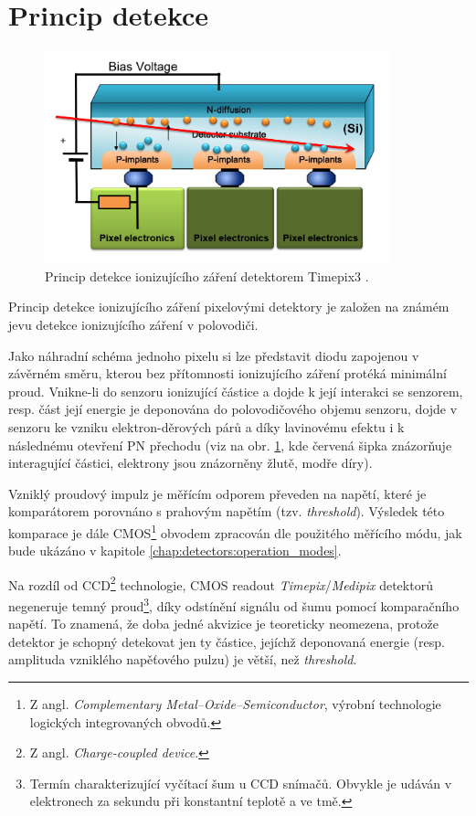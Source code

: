 \section{Princip detekce}\label{chap:detectors:princip}
\begin{figure}[th]
	\begin{center}
		\includegraphics[width=10cm]{figures/det_recombination.png}
		\caption{Princip detekce ionizujícího záření detektorem Timepix3 \cite{PlatkevicDisertace}.}
		\label{fig:det:recombination}
	\end{center}
\end{figure}

Princip detekce ionizujícího záření pixelovými detektory je založen na známém jevu detekce ionizujícího záření v polovodiči. 

Jako náhradní schéma jednoho pixelu si lze představit diodu zapojenou v závěrném směru, kterou bez přítomnosti ionizujícího záření protéká minimální proud. Vnikne-li do senzoru ionizující částice a dojde k její interakci se senzorem, resp. část její energie je deponována do polovodičového objemu senzoru, dojde v senzoru ke vzniku elektron-děrových párů a díky lavinovému efektu i k následnému otevření PN přechodu (viz na obr. \ref{fig:det:recombination}, kde červená šipka znázorňuje interagující částici, elektrony jsou znázorněny žlutě, modře díry).

Vzniklý proudový impulz je měřícím odporem převeden na napětí, které je komparátorem porovnáno s prahovým napětím (tzv. \textit{threshold}). Výsledek této komparace je dále CMOS\footnote{Z angl. \textit{Complementary Metal–Oxide–Semiconductor}, výrobní technologie logických integrovaných obvodů.} obvodem zpracován dle použitého měřícího módu, jak bude ukázáno v kapitole \ref{chap:detectors:operation_modes}.

Na rozdíl od CCD\footnote{Z angl. \textit{Charge-coupled device}.} technologie, CMOS readout \textit{Timepix}/\textit{Medipix} detektorů negeneruje temný proud\footnote{Termín charakterizující vyčítací šum u CCD snímačů. Obvykle je udáván v elektronech za sekundu při konstantní teplotě a ve tmě.}, díky odstínění signálu od šumu pomocí komparačního napětí. To znamená, že doba jedné akvizice je teoreticky neomezena, protože detektor je schopný detekovat jen ty částice, jejíchž deponovaná energie (resp. amplituda vzniklého napěťového pulzu) je větší, než \textit{threshold}.

